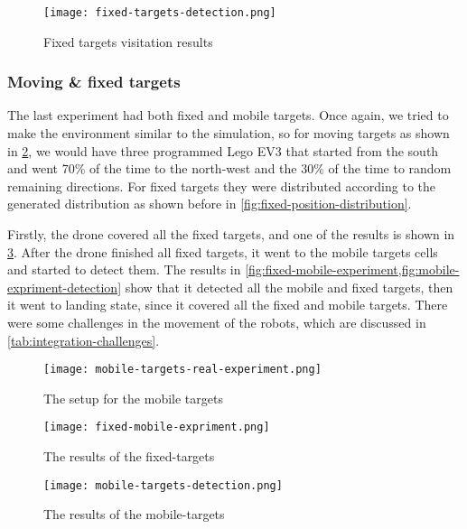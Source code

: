 \documentclass[../main.tex]{subfiles}
\begin{document}
\begin{figure}[tbp]
	\centering
	\texttt{[image: fixed-targets-detection.png]}
	\caption{Fixed targets visitation results}
	\label{fig:fixed-location-detection-camera}
\end{figure}

\subsubsection{Moving \& fixed targets}

The last experiment had both fixed and mobile targets.
Once again, we tried to make the environment similar to the 
simulation, so for moving targets as shown in 
\cref{fig:mobile-targets-real-experiment}, we would have 
three programmed Lego EV3 that started
from the south and went 70\% of the time to the north-west 
and the 30\% of the time to random remaining directions. For fixed
targets they were distributed according to the generated distribution
as shown before in \cref{fig:fixed-position-distribution}.

Firstly, the drone covered all the fixed targets, and one of the 
results is shown in \cref{fig:fixed-mobile-experiment}. After the 
drone finished all fixed targets, it went to the mobile targets cells and
started to detect them. The results in
\cref{fig:fixed-mobile-experiment,fig:mobile-expriment-detection} 
show that it detected all the mobile and fixed targets, 
then it went to landing state, since it covered all the fixed and mobile targets.
There were some challenges in the movement of the robots, which are 
discussed in \cref{tab:integration-challenges}.

\begin{figure}[H]
	\centering
	\texttt{[image: mobile-targets-real-experiment.png]}
	\caption{The setup for the mobile targets}
	\label{fig:mobile-targets-real-experiment}
\end{figure}

\begin{figure}[H]
	\centering
	\texttt{[image: fixed-mobile-expriment.png]}
	\caption{The results of the fixed-targets}
	\label{fig:fixed-mobile-experiment}
\end{figure}

\begin{figure}[H]
	\centering
	\texttt{[image: mobile-targets-detection.png]}
	\caption{The results of the mobile-targets}
	\label{fig:mobile-expriment-detection}
\end{figure}
\end{document}
